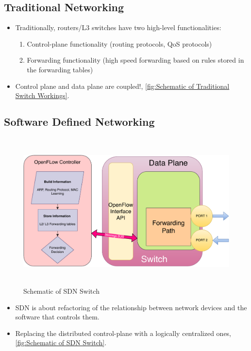 \documentclass[12pt,letterpaper]{article}
\begin{document}
    \subsection{Traditional Networking}

    \begin{itemize}
        \item  Traditionally, routers/L3 switches have two high-level functionalities:
        \begin{enumerate}
            \item Control-plane functionality (routing protocols, QoS protocols)
            \item Forwarding functionality (high speed forwarding based on rules stored in the forwarding tables)
        \end{enumerate}
        \item Control plane and data plane are coupled!, \autoref{fig:Schematic of Traditional Switch Workings}.

    \end{itemize}


    \subsection{Software Defined Networking}

    \begin{figure}[ht]
        \centering
        \includegraphics[height=8cm]{images/schematicSDNSw.drawio.pdf}
        \caption{Schematic of SDN Switch}
        \label{fig:Schematic of SDN Switch}
    \end{figure}

    \begin{itemize}
        \item SDN is about refactoring of the relationship between network devices and the software that controls them. 

        \item Replacing the distributed control-plane with a logically centralized ones, \autoref{fig:Schematic of SDN Switch}.
    \end{itemize}
\end{document}
